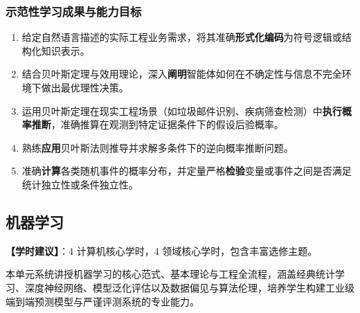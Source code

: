 \subsubsection{示范性学习成果与能力目标}
\begin{enumerate}
    \item 给定自然语言描述的实际工程业务需求，将其准确\textbf{形式化编码}为符号逻辑或结构化知识表示。
    \item 结合贝叶斯定理与效用理论，深入\textbf{阐明}智能体如何在不确定性与信息不完全环境下做出最优理性决策。
    \item 运用贝叶斯定理在现实工程场景（如垃圾邮件识别、疾病筛查检测）中\textbf{执行概率推断}，准确推算在观测到特定证据条件下的假设后验概率。
    \item 熟练\textbf{应用}贝叶斯法则推导并求解多条件下的逆向概率推断问题。
    \item 准确\textbf{计算}各类随机事件的概率分布，并定量严格\textbf{检验}变量或事件之间是否满足统计独立性或条件独立性。
\end{enumerate}

\subsection{机器学习}
\textbf{【学时建议】}：4 计算机核心学时，4 领域核心学时，包含丰富选修主题。

本单元系统讲授机器学习的核心范式、基本理论与工程全流程，涵盖经典统计学习、深度神经网络、模型泛化评估以及数据偏见与算法伦理，培养学生构建工业级端到端预测模型与严谨评测系统的专业能力。

